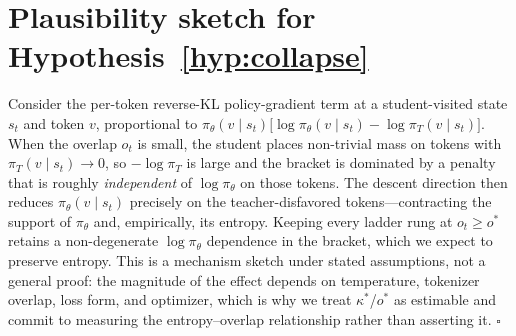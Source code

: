 \documentclass[11pt]{article}
\begin{document}
\section{Plausibility sketch for Hypothesis~\ref{hyp:collapse}}
Consider the per-token reverse-KL policy-gradient term at a student-visited state $s_t$ and token $v$, proportional to $\pi_\theta(v\mid s_t)\big[\log\pi_\theta(v\mid s_t)-\log\pi_T(v\mid s_t)\big]$. When the overlap $o_t$ is small, the student places non-trivial mass on tokens with $\pi_T(v\mid s_t)\to 0$, so $-\log\pi_T$ is large and the bracket is dominated by a penalty that is roughly \emph{independent} of $\log\pi_\theta$ on those tokens. The descent direction then reduces $\pi_\theta(v\mid s_t)$ precisely on the teacher-disfavored tokens---contracting the support of $\pi_\theta$ and, empirically, its entropy. Keeping every ladder rung at $o_t\ge o^\ast$ retains a non-degenerate $\log\pi_\theta$ dependence in the bracket, which we expect to preserve entropy. This is a mechanism sketch under stated assumptions, not a general proof: the magnitude of the effect depends on temperature, tokenizer overlap, loss form, and optimizer, which is why we treat $\kappa^\ast$/$o^\ast$ as estimable and commit to measuring the entropy--overlap relationship rather than asserting it. $\square$
\end{document}
